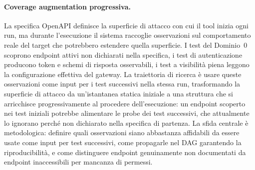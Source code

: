 \paragraph{Coverage augmentation progressiva.}
La specifica OpenAPI definisce la superficie di attacco con cui il tool inizia ogni run, ma durante l'esecuzione il sistema raccoglie osservazioni sul comportamento reale del target che potrebbero estendere quella superficie. I test del Dominio~0 scoprono endpoint attivi non dichiarati nella specifica, i test di autenticazione producono token e schemi di risposta osservabili, i test a visibilità piena leggono la configurazione effettiva del gateway. La traiettoria di ricerca è usare queste osservazioni come input per i test successivi nella stessa run, trasformando la superficie di attacco da un'istantanea statica iniziale a una struttura che si arricchisce progressivamente al procedere dell'esecuzione: un endpoint scoperto nei test iniziali potrebbe alimentare le probe dei test successivi, che attualmente lo ignorano perché non dichiarato nella specifica di partenza. La sfida centrale è metodologica: definire quali osservazioni siano abbastanza affidabili da essere usate come input per test successivi, come propagarle nel \gls{DAG} garantendo la riproducibilità, e come distinguere endpoint genuinamente non documentati da endpoint inaccessibili per mancanza di permessi.